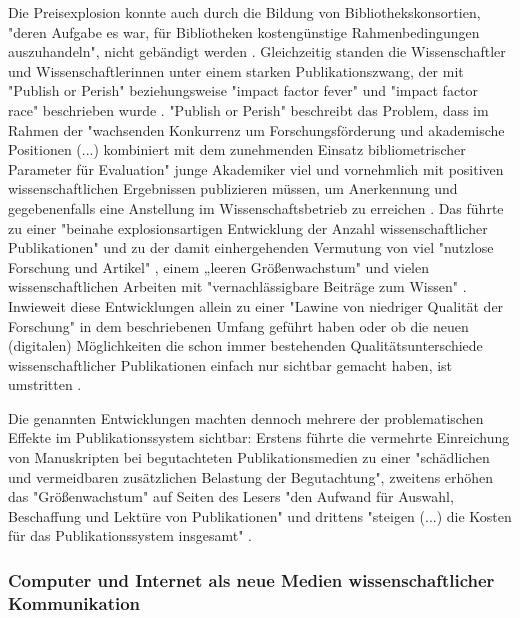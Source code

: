Die Preisexplosion konnte auch durch die Bildung von Bibliothekskonsortien, "deren Aufgabe es war, für Bibliotheken kostengünstige Rahmenbedingungen auszuhandeln", nicht gebändigt werden \cite{Fladung_2003} \cite{Brintzinger_2010}. Gleichzeitig standen die Wissenschaftler und Wissenschaftlerinnen unter einem starken Publikationszwang, der mit "Publish or Perish" \cite{CLAPHAM_2005} beziehungsweise "impact factor fever" \cite{Cherubini_2008} und "impact factor race" \cite{Brischoux_2009} beschrieben wurde \cite{offhaus_2012_institutionelle_repos}. "Publish or Perish" beschreibt das Problem, dass im Rahmen der "wachsenden Konkurrenz um Forschungsförderung und akademische Positionen (...) kombiniert mit dem zunehmenden Einsatz bibliometrischer Parameter für Evaluation" \cite{Fanelli_2010} junge Akademiker viel und vornehmlich mit positiven wissenschaftlichen Ergebnissen publizieren müssen, um Anerkennung und gegebenenfalls eine Anstellung im Wissenschaftsbetrieb zu erreichen \cite{pscheida_2010_wikipedia} \cite{Beasley_2005} \cite{hamilton_1990_publishing}. Das führte zu einer "beinahe explosionsartigen Entwicklung der Anzahl wissenschaftlicher Publikationen" \cite{bortz_Doering_2006_fragestellung} und zu der damit einhergehenden Vermutung von viel "nutzlose Forschung und Artikel" \cite{smith1990killing}, einem „leeren Größenwachstum" \cite{bbaw_publizieren_2015} und vielen wissenschaftlichen Arbeiten mit "vernachlässigbare Beiträge zum Wissen" \cite{hamilton_1990_publishing}. Inwieweit diese Entwicklungen allein zu einer "Lawine von niedriger Qualität der Forschung" \cite{Bauerlein_2010} in dem beschriebenen Umfang geführt haben oder ob die neuen (digitalen) Möglichkeiten die schon immer bestehenden Qualitätsunterschiede wissenschaftlicher Publikationen einfach nur sichtbar gemacht haben, ist umstritten \cite{rekdal_2014_academic}.

Die genannten Entwicklungen machten dennoch mehrere der problematischen Effekte im Publikationssystem sichtbar: Erstens führte die vermehrte Einreichung von Manuskripten bei begutachteten Publikationsmedien zu einer "schädlichen und vermeidbaren zusätzlichen Belastung der Begutachtung", zweitens erhöhen das "Größenwachstum" auf Seiten des Lesers "den Aufwand für Auswahl, Beschaffung und Lektüre von Publikationen" und drittens "steigen (...) die Kosten für das Publikationssystem insgesamt" \cite{bbaw_publizieren_2015}.

\subsubsection{Computer und Internet als neue Medien wissenschaftlicher Kommunikation}

